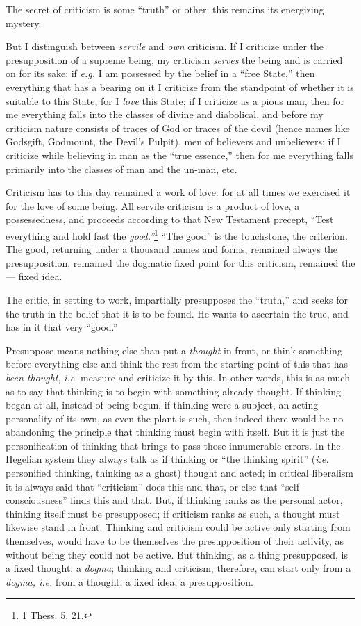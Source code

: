 The secret of criticism is some ``truth'' or other: this remains its 
energizing mystery.

But I distinguish between \textit{servile} and \textit{own} criticism. If I 
criticize under the presupposition of a supreme being, my criticism 
\textit{serves} the being and is carried on for its sake: if \textit{e.g.} I 
am possessed by the belief in a ``free State,'' then everything that has a 
bearing on it I criticize from the standpoint of whether it is suitable to 
this State, for I \textit{love} this State; if I criticize as a pious man, 
then for me everything falls into the classes of divine and diabolical, and 
before my criticism nature consists of traces of God or traces of the devil 
(hence names like Godsgift, Godmount, the Devil's Pulpit), men of believers 
and unbelievers; if I criticize while believing in man as the ``true 
essence,'' then for me everything falls primarily into the classes of man and 
the un-man, etc.

Criticism has to this day remained a work of love: for at all times we 
exercised it for the love of some being. All servile criticism is a product of 
love, a possessedness, and proceeds according to that New Testament precept, 
``Test everything and hold fast the \textit{good.''}\footnote{1 Thess. 5. 
21.} ``The good'' is the touchstone, the criterion. The good, returning 
under a thousand names and forms, remained always the presupposition, remained 
the dogmatic fixed point for this criticism, remained the --- fixed idea.

The critic, in setting to work, impartially presupposes the ``truth,'' and 
seeks for the truth in the belief that it is to be found. He wants to 
ascertain the true, and has in it that very ``good.''

Presuppose means nothing else than put a \textit{thought} in front, or think 
something before everything else and think the rest from the starting-point of 
this that has \textit{been thought}, \textit{i.e.} measure and criticize it by 
this. In other words, this is as much as to say that thinking is to begin with 
something already thought. If thinking began at all, instead of being begun, 
if thinking were a subject, an acting personality of its own, as even the 
plant is such, then indeed there would be no abandoning the principle that 
thinking must begin with itself. But it is just the personification of 
thinking that brings to pass those innumerable errors. In the Hegelian system 
they always talk as if thinking or ``the thinking spirit'' (\textit{i.e.} 
personified thinking, thinking as a ghost) thought and acted; in critical 
liberalism it is always said that ``criticism'' does this and that, or else 
that ``self- consciousness'' finds this and that. But, if thinking ranks as 
the personal actor, thinking itself must be presupposed; if criticism ranks as 
such, a thought must likewise stand in front. Thinking and criticism could be 
active only starting from themselves, would have to be themselves the 
presupposition of their activity, as without being they could not be active. 
But thinking, as a thing presupposed, is a fixed thought, a \textit{dogma}; 
thinking and criticism, therefore, can start only from a \textit{dogma, i.e.} 
from a thought, a fixed idea, a presupposition.

